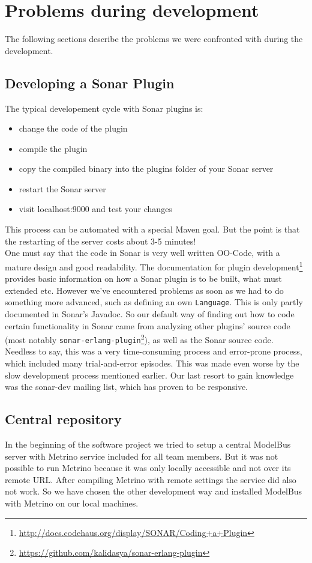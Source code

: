 \section{Problems during development}

The following sections describe the problems we were confronted with
during the development.

\subsection{Developing a Sonar Plugin}
The typical developement cycle with Sonar plugins is:
\begin{itemize}
	\item change the code of the plugin
	\item compile the plugin
	\item copy the compiled binary into the plugins folder of your Sonar server
	\item restart the Sonar server
	\item visit localhost:9000 and test your changes
\end{itemize}
This process can be automated with a special Maven goal. But the point is that the restarting of the server costs about 3-5 minutes!\\

One must say that the code in Sonar is very well written OO-Code, with
a mature design and good readability. The documentation for plugin
development\footnote{\href{http://docs.codehaus.org/display/SONAR/Coding+a+Plugin}{http://docs.codehaus.org/display/SONAR/Coding+a+Plugin}}
provides basic information on how a Sonar plugin is to be built, what
must extended etc. However we've encountered problems as soon as we
had to do something more advanced, such as defining an own
\texttt{Language}.  This is only partly documented in Sonar's
Javadoc. So our default way of finding out how to code certain
functionality in Sonar came from analyzing other plugins' source code
(most notably
\texttt{sonar-erlang-plugin}\footnote{\href{https://github.com/kalidasya/sonar-erlang-plugin}{https://github.com/kalidasya/sonar-erlang-plugin}}),
as well as the Sonar source code.  Needless to say, this was a very
time-consuming process and error-prone process, which included many
trial-and-error episodes. This was made even worse by the slow
development process mentioned earlier.  Our last resort to gain
knowledge was the sonar-dev mailing list, which has proven to be
responsive.


\subsection{Central repository}
In the beginning of the software project we tried to setup a central
ModelBus server with Metrino service included for all team
members. But it was not possible to run Metrino because it was only
locally accessible and not over its remote URL. After compiling
Metrino with remote settings the service did also not work. So we have
chosen the other development way and installed ModelBus with Metrino
on our local machines.
		
